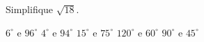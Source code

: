 Simplifique $\sqrt{18}.$

$6^\circ$ e $96^\circ$
$4^\circ$ e $94^\circ$
$15^\circ$ e $75^\circ$
$120^\circ$ e $60^\circ$
$90^\circ$ e $45^\circ$




